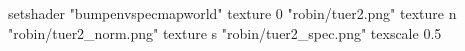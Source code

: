 setshader "bumpenvspecmapworld"
   texture 0 "robin/tuer2.png"
   texture n "robin/tuer2_norm.png"
   texture s "robin/tuer2_spec.png"
texscale 0.5